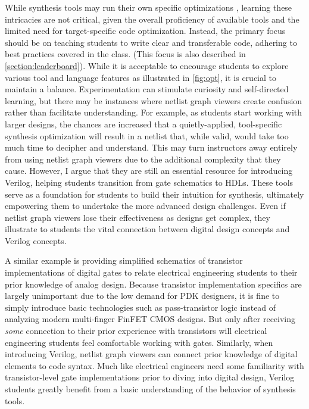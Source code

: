 While synthesis tools may run their own specific optimizations \cite{1364.1-2005}, learning these intricacies are not critical, given the overall proficiency of available tools and the limited need for target-specific code optimization.
Instead, the primary focus should be on teaching students to write clear and transferable code, adhering to best practices covered in the class.
(This focus is also described in \autoref{section:leaderboard}).
While it is acceptable to encourage students to explore various tool and language features as illustrated in \autoref{fig:opt}, it is crucial to maintain a balance.
Experimentation can stimulate curiosity and self-directed learning, but there may be instances where netlist graph viewers create confusion rather than facilitate understanding.
For example, as students start working with larger designs, the chances are increased that a quietly-applied, tool-specific synthesis optimization will result in a netlist that, while valid, would take too much time to decipher and understand.
This may turn instructors away entirely from using netlist graph viewers due to the additional complexity that they cause.
However, I argue that they are still an essential resource for introducing Verilog, helping students transition from gate schematics to HDLs.
These tools serve as a foundation for students to build their intuition for synthesis, ultimately empowering them to undertake the more advanced design challenges.
Even if netlist graph viewers lose their effectiveness as designs get complex, they illustrate to students the vital connection between digital design concepts and Verilog concepts.

A similar example is providing simplified schematics of transistor implementations of digital gates to relate electrical engineering students to their prior knowledge of analog design.
Because transistor implementation specifics are largely unimportant due to the low demand for PDK designers, it is fine to simply introduce basic technologies such as pass-transistor logic instead of analyzing modern multi-finger FinFET CMOS designs.
But only after receiving \emph{some} connection to their prior experience with transistors will electrical engineering students feel comfortable working with gates.
Similarly, when introducing Verilog, netlist graph viewers can connect prior knowledge of digital elements to code syntax.
Much like electrical engineers need some familiarity with transistor-level gate implementations prior to diving into digital design, Verilog students greatly benefit from a basic understanding of the behavior of synthesis tools.

